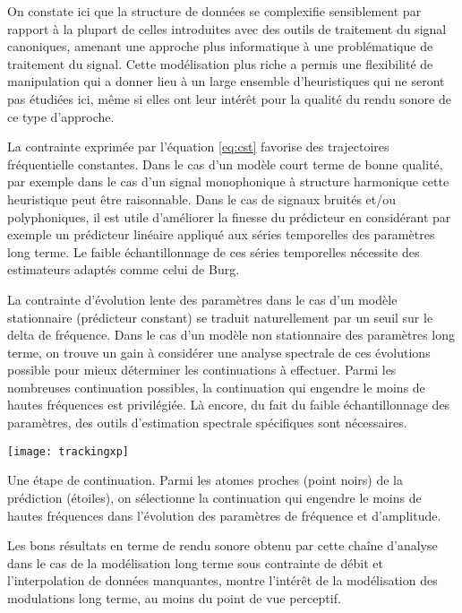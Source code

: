 On constate ici que la structure de données se complexifie sensiblement par rapport à la plupart de celles introduites avec des outils de traitement du signal canoniques, amenant une approche plus \og informatique \fg à une problématique de traitement du signal. Cette modélisation plus \og riche \fg a permis une flexibilité de manipulation qui a donner lieu à un large ensemble d'heuristiques qui ne seront pas étudiées ici, même si elles ont leur intérêt pour la qualité du rendu sonore de ce type d'approche.

La contrainte exprimée par l'équation \ref{eq:cst} favorise des trajectoires fréquentielle constantes. Dans le cas d'un modèle court terme de bonne qualité, par exemple dans le cas d'un signal monophonique à structure harmonique cette heuristique peut être raisonnable. Dans le cas de signaux bruités et/ou polyphoniques, il est utile d'améliorer la finesse du prédicteur en considérant par exemple un prédicteur linéaire appliqué aux séries temporelles des paramètres long terme. Le faible échantillonnage de ces séries temporelles nécessite des estimateurs adaptés comme celui de Burg\cite{burg1968new}.

La contrainte d'évolution lente des paramètres dans le cas d'un modèle stationnaire (prédicteur constant) se traduit naturellement par un seuil sur le delta de fréquence. Dans le cas d'un modèle non stationnaire des paramètres long terme, on trouve un gain à considérer une analyse spectrale de ces évolutions possible pour mieux déterminer les continuations à effectuer. Parmi les nombreuses continuation possibles, la continuation qui engendre le moins de hautes fréquences est privilégiée. Là encore, du fait du faible échantillonnage des paramètres, des outils d'estimation spectrale spécifiques sont nécessaires.

\begin{marginfigure}
  \texttt{[image: trackingxp]}
  \caption{Une étape de continuation. Parmi les atomes proches (point noirs) de la prédiction (étoiles), on sélectionne la continuation qui engendre le moins de hautes fréquences dans l'évolution des paramètres de fréquence et d'amplitude.}
  \label{fig:tracking}
\end{marginfigure}

Les bons résultats en terme de rendu sonore obtenu par cette chaîne d'analyse dans le cas  de la modélisation long terme sous contrainte de débit\cite{lagrangeTaslp06} et l'interpolation de données manquantes\cite{lagrangeJaes05}, montre l'intérêt de la modélisation des modulations long terme, au moins du point de vue perceptif.

